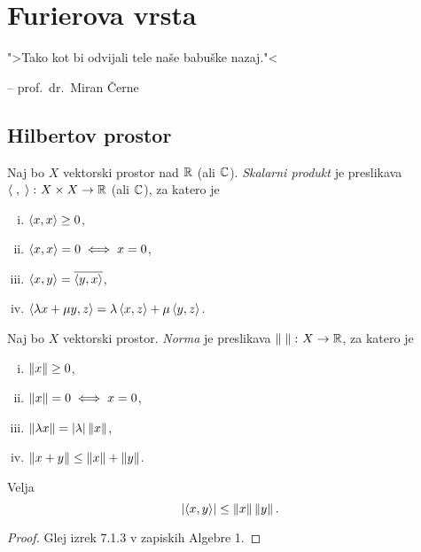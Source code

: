 \section{Furierova vrsta}

\epigraph{">Tako kot bi odvijali tele naše babuške nazaj."<}
{-- prof.~dr.~Miran Černe}

\subsection{Hilbertov prostor}


\begin{definicija}
Naj bo $X$ vektorski prostor nad $\mathbb{R}$ (ali $\mathbb{C}$).
\emph{Skalarni produkt} je preslikava
$\left\langle \;,\;\right\rangle \colon X \times X \to \mathbb{R}$ (ali $\mathbb{C}$), za katero je

\begin{enumerate}[i)]
\item $\left\langle x,x\right\rangle \geq 0$,
\item $\left\langle x,x\right\rangle = 0 \iff x = 0$,
\item $\left\langle x,y\right\rangle = \overline{\left\langle y,x\right\rangle}$,
\item $\left\langle \lambda x + \mu y, z\right\rangle =
\lambda \left\langle x,z\right\rangle + \mu \left\langle y,z\right\rangle$.
\end{enumerate}
\end{definicija}

\begin{definicija}
Naj bo $X$ vektorski prostor. \emph{Norma} je
preslikava $\left\lVert \;\right\rVert \colon X \to \mathbb{R}$, za katero je

\begin{enumerate}[i)]
\item $\left\lVert x\right\rVert \geq 0$,
\item $\left\lVert x\right\rVert = 0 \iff x = 0$,
\item $\left\lVert \lambda x\right\rVert = \left\lvert \lambda\right\rvert \left\lVert x\right\rVert$,
\item $\left\lVert x+y\right\rVert \leq \left\lVert x\right\rVert + \left\lVert y\right\rVert$.
\end{enumerate}
\end{definicija}

\begin{izrek}
Velja
\[
\left\lvert \left\langle x,y\right\rangle\right\rvert \leq \left\lVert x\right\rVert \left\lVert y\right\rVert.
\]
\end{izrek}

\begin{proof}
Glej izrek 7.1.3 v zapiskih Algebre 1.
\end{proof}

